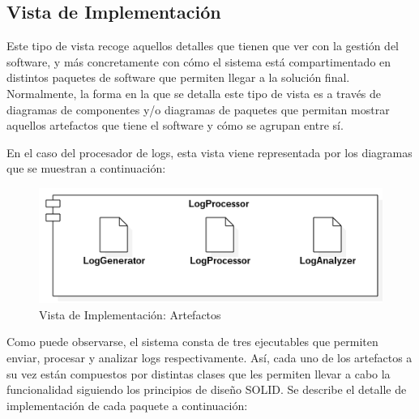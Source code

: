 \documentclass[11pt]{article}
\begin{document}
\subsection{Vista de Implementación}

Este tipo de vista recoge aquellos detalles que tienen que ver con la gestión del software, y más concretamente con cómo el sistema está compartimentado en distintos paquetes de software que permiten llegar a la solución final. Normalmente, la forma en la que se detalla este tipo de vista es a través de diagramas de componentes y/o diagramas de paquetes que permitan mostrar aquellos artefactos que tiene el software y cómo se agrupan entre sí.

En el caso del procesador de logs, esta vista viene representada por los diagramas que se muestran a continuación:

\begin{center}
 \begin{figure}[H]
 \begin{center}
   \includegraphics[width=15cm]{img/implementation_view00.png}
   \caption{Vista de Implementación: Artefactos}
   \label{fig:4plus1views}
 \end{center}
 \end{figure}
\end{center}

Como puede observarse, el sistema consta de tres ejecutables que permiten enviar, procesar y analizar logs respectivamente. Así, cada uno de los artefactos a su vez están compuestos por distintas clases que les permiten llevar a cabo la funcionalidad siguiendo los principios de diseño SOLID. Se describe el detalle de implementación de cada paquete a continuación:
\end{document}
